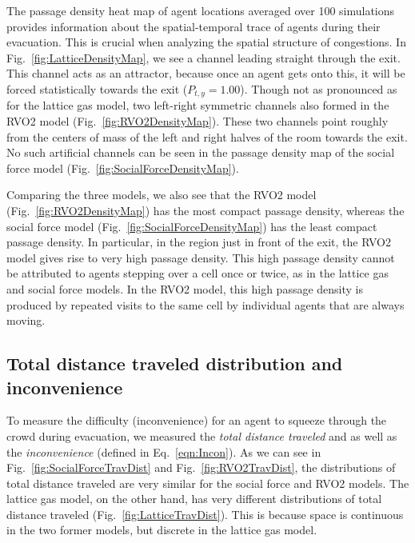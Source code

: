 The passage density heat map of agent locations averaged over 100 simulations provides information about the spatial-temporal trace of agents during their evacuation. This is crucial when analyzing the spatial structure of congestions. In Fig.~\ref{fig:LatticeDensityMap}, we see a channel leading straight through the exit. This channel acts as an attractor, because once an agent gets onto this, it will be forced statistically towards the exit ($P_{t,y} = 1.00$). Though not as pronounced as for the lattice gas model, two left-right symmetric channels also formed in the RVO2 model (Fig.~\ref{fig:RVO2DensityMap}). These two channels point roughly from the centers of mass of the left and right halves of the room towards the exit. No such artificial channels can be seen in the passage density map of the social force model (Fig.~\ref{fig:SocialForceDensityMap}).


Comparing the three models, we also see that the RVO2 model (Fig.~\ref{fig:RVO2DensityMap}) has the most compact passage density, whereas the social force model (Fig.~\ref{fig:SocialForceDensityMap}) has the least compact passage density. In particular, in the region just in front of the exit, the RVO2 model gives rise to very high passage density. This high passage density cannot be attributed to agents stepping over a cell once or twice, as in the lattice gas and social force models. In the RVO2 model, this high passage density is produced by repeated visits to the same cell by individual agents that are always moving.



\subsection{Total distance traveled distribution and inconvenience}
To measure the difficulty (inconvenience) for an agent to squeeze through the crowd during evacuation, we measured the \emph{total distance traveled} and as well as the \emph{inconvenience} (defined in Eq.~\ref{eqn:Incon}). As we can see in Fig.~\ref{fig:SocialForceTravDist} and Fig.~\ref{fig:RVO2TravDist}, the distributions of total distance traveled are very similar for the social force and RVO2 models. The lattice gas model, on the other hand, has very different distributions of total distance traveled (Fig.~\ref{fig:LatticeTravDist}). This is because space is continuous in the two former models, but discrete in the lattice gas model.

